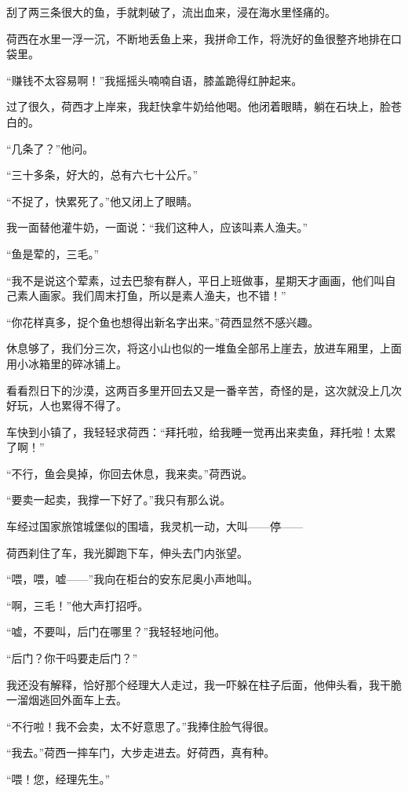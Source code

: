 \par 刮了两三条很大的鱼，手就刺破了，流出血来，浸在海水里怪痛的。
\par 荷西在水里一浮一沉，不断地丢鱼上来，我拼命工作，将洗好的鱼很整齐地排在口袋里。
\par “赚钱不太容易啊！”我摇摇头喃喃自语，膝盖跪得红肿起来。
\par 过了很久，荷西才上岸来，我赶快拿牛奶给他喝。他闭着眼睛，躺在石块上，脸苍白的。
\par “几条了？”他问。
\par “三十多条，好大的，总有六七十公斤。”
\par “不捉了，快累死了。”他又闭上了眼睛。
\par 我一面替他灌牛奶，一面说：“我们这种人，应该叫素人渔夫。”
\par “鱼是荤的，三毛。”
\par “我不是说这个荤素，过去巴黎有群人，平日上班做事，星期天才画画，他们叫自己素人画家。我们周末打鱼，所以是素人渔夫，也不错！”
\par “你花样真多，捉个鱼也想得出新名字出来。”荷西显然不感兴趣。
\par 休息够了，我们分三次，将这小山也似的一堆鱼全部吊上崖去，放进车厢里，上面用小冰箱里的碎冰铺上。
\par 看看烈日下的沙漠，这两百多里开回去又是一番辛苦，奇怪的是，这次就没上几次好玩，人也累得不得了。
\par 车快到小镇了，我轻轻求荷西：“拜托啦，给我睡一觉再出来卖鱼，拜托啦！太累了啊！”
\par “不行，鱼会臭掉，你回去休息，我来卖。”荷西说。
\par “要卖一起卖，我撑一下好了。”我只有那么说。
\par 车经过国家旅馆城堡似的围墙，我灵机一动，大叫——停——
\par 荷西刹住了车，我光脚跑下车，伸头去门内张望。
\par “喂，喂，嘘——”我向在柜台的安东尼奥小声地叫。
\par “啊，三毛！”他大声打招呼。
\par “嘘，不要叫，后门在哪里？”我轻轻地问他。
\par “后门？你干吗要走后门？”
\par 我还没有解释，恰好那个经理大人走过，我一吓躲在柱子后面，他伸头看，我干脆一溜烟逃回外面车上去。
\par “不行啦！我不会卖，太不好意思了。”我捧住脸气得很。
\par “我去。”荷西一摔车门，大步走进去。好荷西，真有种。
\par “喂！您，经理先生。”
